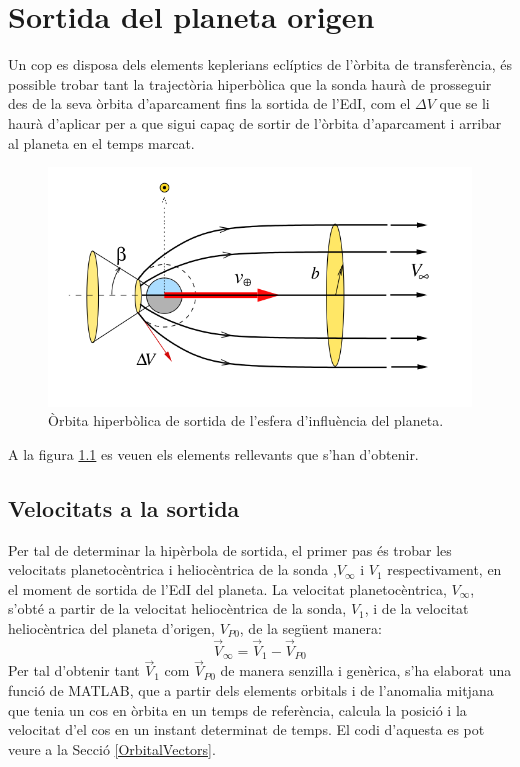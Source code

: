 \chapter{Sortida del planeta origen}
Un cop es disposa dels elements keplerians eclíptics de l'òrbita de transferència, és possible trobar tant la trajectòria hiperbòlica que la sonda haurà de prosseguir des de la seva òrbita d'aparcament fins la sortida de l'EdI, com el $\Delta V$ que se li haurà d'aplicar per a que sigui capaç de sortir de l'òrbita d'aparcament i arribar al planeta en el temps marcat.

\begin{figure}[H]
	\centering
	\includegraphics[scale=0.5]{./plots/hyperbola}
	\caption{Òrbita hiperbòlica de sortida de l'esfera d'influència del planeta.}
	\label{esquema_hyperbola}
\end{figure}
A la figura \ref{esquema_hyperbola} es veuen els elements rellevants que s'han d'obtenir.
\section{Velocitats a la sortida}
Per tal de determinar la hipèrbola de sortida, el primer pas és trobar les velocitats planetocèntrica i heliocèntrica de la sonda ,$V_{\infty}$ i $V_1$ respectivament, en el moment de sortida de l'EdI del planeta. La velocitat planetocèntrica, $V_{\infty}$, s'obté a partir de la velocitat heliocèntrica de la sonda, $V_1$, i de la velocitat heliocèntrica del planeta d'origen, $V_{P0}$, de la següent manera:
\begin{equation}
\vec{V}_{\infty} = \vec{V}_{1} - \vec{V}_{P0}
\end{equation}
Per tal d'obtenir tant $\vec{V}_{1}$ com $\vec{V}_{P0}$ de manera senzilla i genèrica, s'ha elaborat una funció de MATLAB, que a partir dels elements orbitals i de l'anomalia mitjana que tenia un cos en òrbita en un temps de referència, calcula la posició i la velocitat d'el cos en un instant determinat de temps. El codi d'aquesta es pot veure a la Secció \ref{OrbitalVectors}.

